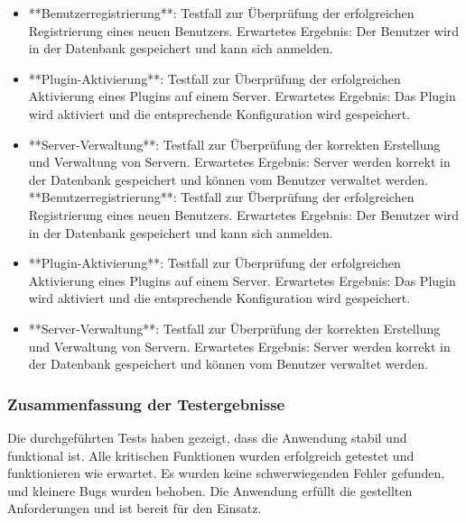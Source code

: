 \begin{itemize}
  \item
        **Benutzerregistrierung**: Testfall zur Überprüfung der erfolgreichen Registrierung eines neuen Benutzers. Erwartetes Ergebnis: Der Benutzer wird in der Datenbank gespeichert und kann sich anmelden.
  \item
        **Plugin-Aktivierung**: Testfall zur Überprüfung der erfolgreichen Aktivierung eines Plugins auf einem Server. Erwartetes Ergebnis: Das Plugin wird aktiviert und die entsprechende Konfiguration wird gespeichert.
  \item
        **Server-Verwaltung**: Testfall zur Überprüfung der korrekten Erstellung und Verwaltung von Servern. Erwartetes Ergebnis: Server werden korrekt in der Datenbank gespeichert und können vom Benutzer verwaltet werden.
        **Benutzerregistrierung**: Testfall zur Überprüfung der erfolgreichen Registrierung eines neuen Benutzers. Erwartetes Ergebnis: Der Benutzer wird in der Datenbank gespeichert und kann sich anmelden.
  \item
        **Plugin-Aktivierung**: Testfall zur Überprüfung der erfolgreichen Aktivierung eines Plugins auf einem Server. Erwartetes Ergebnis: Das Plugin wird aktiviert und die entsprechende Konfiguration wird gespeichert.
  \item
        **Server-Verwaltung**: Testfall zur Überprüfung der korrekten Erstellung und Verwaltung von Servern. Erwartetes Ergebnis: Server werden korrekt in der Datenbank gespeichert und können vom Benutzer verwaltet werden.
\end{itemize}

\subsubsection{Zusammenfassung der Testergebnisse}

Die durchgeführten Tests haben gezeigt, dass die Anwendung stabil und funktional ist. Alle kritischen Funktionen wurden erfolgreich getestet und funktionieren wie erwartet. Es wurden keine schwerwiegenden Fehler gefunden, und kleinere Bugs wurden behoben. Die Anwendung erfüllt die gestellten Anforderungen und ist bereit für den Einsatz.